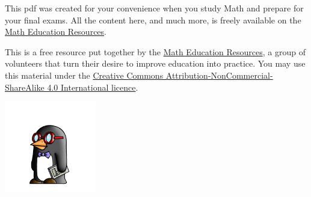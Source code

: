 {\small This pdf was created for your convenience when you study Math and prepare for your final exams. All the content here, and much more, is freely available on the \href{http://www.math-education-resources.com}{Math Education Resources}.}

\vfill

\begin{multicols}{2}
\hfill \begin{minipage}{0.45\textwidth}This is a free resource put together by the \href{http://www.math-education-resources.com}{Math Education Resources}, a group of volunteers that turn their desire to improve education into practice. You may use this material under the \href{https://creativecommons.org/licenses/by-nc-sa/4.0/}{Creative Commons Attribution-NonCommercial-ShareAlike 4.0 International licence}.

\end{minipage}

\columnbreak

\begin{center}
\includegraphics[width=0.3\textwidth]{MER_penguin_left.png}
\end{center}

\end{multicols}

\vfill
